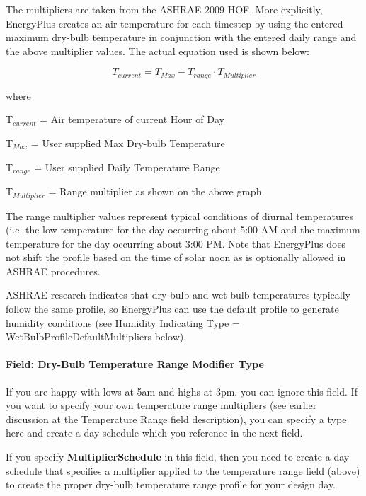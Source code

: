 The multipliers are taken from the ASHRAE 2009 HOF. More explicitly, EnergyPlus creates an air temperature for each timestep by using the entered maximum dry-bulb temperature in conjunction with the entered daily range and the above multiplier values. The actual equation used is shown below:

\begin{equation}
{T_{current}} = {T_{Max}} - {T_{range}}\cdot {T_{Multiplier}}
\end{equation}

where

T\(_{current}\) = Air temperature of current Hour of Day

T\(_{Max}\) = User supplied Max Dry-bulb Temperature

T\(_{range}\) = User supplied Daily Temperature Range

T\(_{Multiplier}\) = Range multiplier as shown on the above graph

The range multiplier values represent typical conditions of diurnal temperatures (i.e. the low temperature for the day occurring about 5:00 AM and the maximum temperature for the day occurring about 3:00 PM. Note that EnergyPlus does not shift the profile based on the time of solar noon as is optionally allowed in ASHRAE procedures.

ASHRAE research indicates that dry-bulb and wet-bulb temperatures typically follow the same profile, so EnergyPlus can use the default profile to generate humidity conditions (see Humidity Indicating Type = WetBulbProfileDefaultMultipliers below).

\paragraph{Field: Dry-Bulb Temperature Range Modifier Type}\label{field-dry-bulb-temperature-range-modifier-type}

If you are happy with lows at 5am and highs at 3pm, you can ignore this field. If you want to specify your own temperature range multipliers (see earlier discussion at the Temperature Range field description), you can specify a type here and create a day schedule which you reference in the next field.

If you specify \textbf{MultiplierSchedule} in this field, then you need to create a day schedule that specifies a multiplier applied to the temperature range field (above) to create the proper dry-bulb temperature range profile for your design day.

